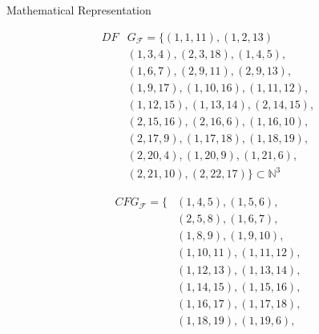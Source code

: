 \begin{blackbox}{Mathematical Representation}
    \centering
    \begin{minipage}{0.329\textwidth}
        \begin{graybox}
            \scriptsize
            \setlength{\abovedisplayskip}{0pt}
            \setlength{\belowdisplayskip}{0pt}
            \vspace{-0.5em}
            \begin{align*}
                DF&G_\mathcal F=\{(1,1,11),(1,2,13)\\[-0.5em]
                  &(1,3,4),(2,3,18),(1,4,5),\\[-0.5em]
                  &(1,6,7),(2,9,11),(2,9,13),\\[-0.5em]
                  &(1,9,17),(1,10,16),(1,11,12),\\[-0.5em]
                  &(1,12,15),(1,13,14),(2,14,15),\\[-0.5em]
                  &(2,15,16),(2,16,6),(1,16,10),\\[-0.5em]
                  &(2,17,9),(1,17,18),(1,18,19),\\[-0.5em]
                  &(2,20,4),(1,20,9),(1,21,6),\\[-0.5em]
                  &(2,21,10),(2,22,17)\}\subset\mathbb N^3
            \end{align*}
        \end{graybox}
    \end{minipage}
    \begin{minipage}{0.329\textwidth}
        \begin{graybox}
            \scriptsize
            \setlength{\abovedisplayskip}{0pt}
            \setlength{\belowdisplayskip}{0pt}
            \vspace{-0.5em}
            \begin{align*}
                CFG_\mathcal F=\{&(1,4,5),(1,5,6),\\[-0.5em]
                  &(2,5,8),(1,6,7),\\[-0.5em]
                  &(1,8,9),(1,9,10),\\[-0.5em]
                  &(1,10,11),(1,11,12),\\[-0.5em]
                  &(1,12,13),(1,13,14),\\[-0.5em]
                  &(1,14,15),(1,15,16),\\[-0.5em]
                  &(1,16,17),(1,17,18),\\[-0.5em]
                  &(1,18,19),(1,19,6),\\[-0.5em]

\end{align*}
\end{graybox}
\end{minipage}
\end{blackbox}
